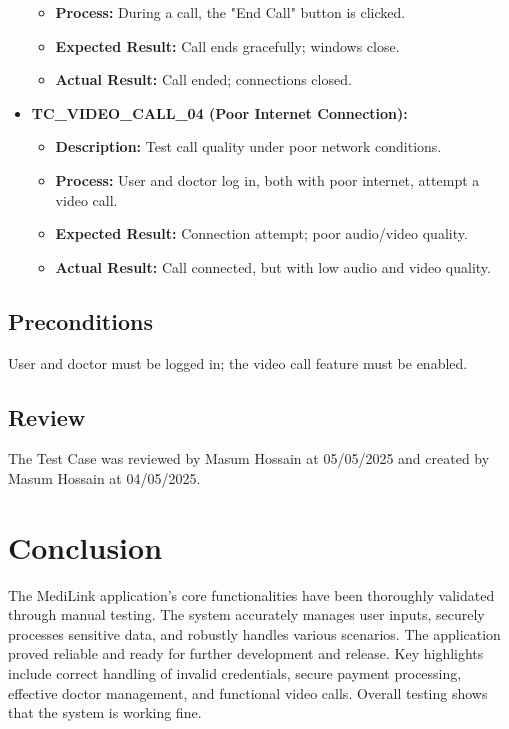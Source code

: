 \documentclass{article}
\begin{document}
\begin{itemize}
\begin{itemize}
        \item \textbf{Process:} During a call, the "End Call" button is clicked.
        \item \textbf{Expected Result:} Call ends gracefully; windows close.
        \item \textbf{Actual Result:} Call ended; connections closed.
    \end{itemize}
    \item \textbf{TC\_VIDEO\_CALL\_04 (Poor Internet Connection):}
    \begin{itemize}
        \item \textbf{Description:} Test call quality under poor network conditions.
        \item \textbf{Process:} User and doctor log in, both with poor internet, attempt a video call.
        \item \textbf{Expected Result:} Connection attempt; poor audio/video quality.
        \item \textbf{Actual Result:} Call connected, but with low audio and video quality.
    \end{itemize}
\end{itemize}

\subsection{Preconditions}
User and doctor must be logged in; the video call feature must be enabled.

\subsection{Review}
The Test Case was reviewed by Masum Hossain at 05/05/2025 and created by Masum Hossain at 04/05/2025.

\section{Conclusion}

The MediLink application's core functionalities have been thoroughly validated through manual testing. The system accurately manages user inputs, securely processes sensitive data, and robustly handles various scenarios. The application proved reliable and ready for further development and release. Key highlights include correct handling of invalid credentials, secure payment processing, effective doctor management, and functional video calls. Overall testing shows that the system is working fine.
\end{document}

